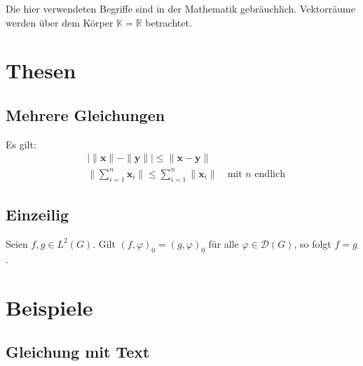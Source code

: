 \begin{corollary}
	Die hier verwendeten Begriffe sind in der Mathematik gebräuchlich.
	Vektorräume werden über dem Körper $\mathbb{K}=\mathbb{R}$ betrachtet.
\end{corollary}


\section{Thesen}

\subsection{Mehrere Gleichungen}

\begin{proposition}
	Es gilt:
	\begin{align}
		& \big| \|\mathbf{x}\| - \|\mathbf{y}\| \big| \leq \|\mathbf{x}-\mathbf{y}\| \\
		& \Big\|\sum_{i=1}^n \mathbf{x}_i\Big\| \leq \sum_{i=1}^n \|\mathbf{x}_i\|
		  \quad\text{mit $n$ endlich}
	\end{align}
\end{proposition}

\subsection{Einzeilig}

\begin{proposition}
	Seien $f,g\in L^2(G)$. Gilt $(f,\varphi)_0=(g,\varphi)_0$ für alle
	$\varphi\in\mathcal{D}(G)$, so folgt $f=g$.
\end{proposition}


\section{Beispiele}

\subsection{Gleichung mit Text}

